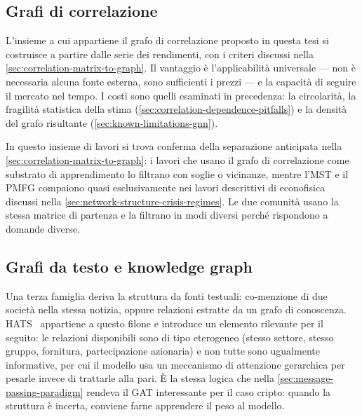 \subsection{Grafi di correlazione}

L'insieme a cui appartiene il grafo di correlazione proposto in questa tesi si costruisce a partire dalle serie dei rendimenti, con i criteri discussi nella \cref{sec:correlation-matrix-to-graph}. Il vantaggio è l'applicabilità universale — non è necessaria alcuna fonte esterna, sono sufficienti i prezzi — e la capacità di seguire il mercato nel tempo. I costi sono quelli esaminati in precedenza: la circolarità, la fragilità statistica della stima (\cref{sec:correlation-dependence-pitfalls}) e la densità del grafo risultante (\cref{sec:known-limitations-gnn}).

In questo insieme di lavori si trova conferma della separazione anticipata nella \cref{sec:correlation-matrix-to-graph}: i lavori che usano il grafo di correlazione come substrato di apprendimento lo filtrano con soglie o vicinanze, mentre l'MST e il PMFG compaiono quasi esclusivamente nei lavori descrittivi di econofisica discussi nella \cref{sec:network-structure-crisis-regimes}. Le due comunità usano la stessa matrice di partenza e la filtrano in modi diversi perché rispondono a domande diverse.

\subsection{Grafi da testo e knowledge graph}

Una terza famiglia deriva la struttura da fonti testuali: co-menzione di due società nella stessa notizia, oppure relazioni estratte da un grafo di conoscenza. HATS~\cite{kim2019hats} appartiene a questo filone e introduce un elemento rilevante per il seguito: le relazioni disponibili sono di tipo eterogeneo (stesso settore, stesso gruppo, fornitura, partecipazione azionaria) e non tutte sono ugualmente informative, per cui il modello usa un meccanismo di attenzione gerarchica per pesarle invece di trattarle alla pari. È la stessa logica che nella \cref{sec:message-passing-paradigm} rendeva il GAT interessante per il caso cripto: quando la struttura è incerta, conviene farne apprendere il peso al modello.

